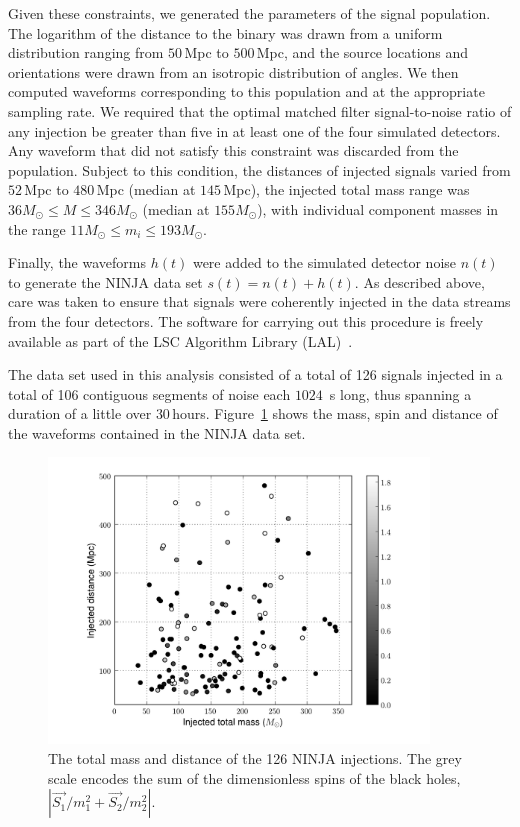 Given these constraints, we generated the parameters of the signal
population.  The logarithm of the distance to the binary was drawn
from a uniform distribution ranging from $50\,$Mpc to $500\,$Mpc, and
the source locations and orientations were drawn from an isotropic
distribution of angles.  We then computed waveforms corresponding to
this population and at the appropriate sampling rate. We required that
the optimal matched filter signal-to-noise ratio of any injection be
greater than five in at least one of the four simulated detectors.
Any waveform that did not satisfy this constraint was discarded from
the population.  Subject to this condition, the distances of injected
signals varied from $52\,$Mpc to $480\,$Mpc (median at $145\,$Mpc),
the injected total mass range was $36M_\odot \le M \le346M_\odot$
(median at $155 M_\odot$), with individual component masses in the
range $11 M_\odot \le m_i \le193M_\odot$.  

Finally, the waveforms $h(t)$ were added to the simulated detector noise
$n(t)$ to generate the NINJA data set $s(t) = n(t) + h(t)$. As described
above, care was taken to ensure that signals were coherently injected in the
data streams from the four detectors.  The software for carrying out this
procedure is freely available as part of the LSC Algorithm Library
(LAL)~\cite{lal}.

The data set used in this analysis consisted of a total of 126 signals
injected in a total of 106 contiguous segments of noise each $1024\,$ s
long, thus spanning a duration of a little over $30\,$hours.
Figure~\ref{fig:distvsmass} shows the mass, spin and distance of the waveforms
contained in the NINJA data set.
\begin{figure}
  \begin{center}
  \includegraphics[width=0.9\textwidth]{figures/ninja1/DistanceVsMass_injected_withSpins}
  \end{center}
  \caption[Distribution of NINJA-1 injections]{The total mass and distance of the 126 NINJA injections. The
    grey scale encodes the sum of the dimensionless spins of the black holes, 
$|\vec{S_1}/m_1^2 + \vec{S_2}/m_2^2|$.}
  \label{fig:distvsmass}
\end{figure}


